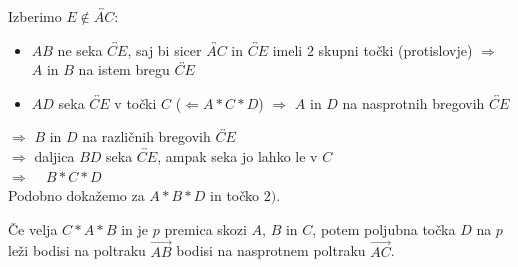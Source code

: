 \begin{dokaz}
                    
                \noindent Izberimo $E\notin \overleftrightarrow{AC}$:
                \begin{itemize}
                    \item $AB$ ne seka $\overleftrightarrow{CE}$, saj bi sicer $\overleftrightarrow{AC}$ in $\overleftrightarrow{CE}$ imeli $2$ skupni točki (protislovje) $\Rightarrow$ $A$ in $B$ na istem bregu $\overleftrightarrow{CE}$
                    \item $AD$ seka $\overleftrightarrow{CE}$ v točki $C$ ($\Leftarrow A\ast C\ast D$) $\Rightarrow$ $A$ in $D$ na nasprotnih bregovih $\overleftrightarrow{CE}$
                \end{itemize}
                $\Rightarrow$ $B$ in $D$ na različnih bregovih $\overleftrightarrow{CE}$ \\
                $\Rightarrow$ daljica $BD$ seka $\overleftrightarrow{CE}$, ampak seka jo lahko le v $C$ \\
                $\Rightarrow$ ~ $B\ast C\ast D$ \\
                Podobno dokažemo za $A\ast B\ast D$ in točko $2)$.
        \end{dokaz}

    \begin{posledica}
        Če velja $C\ast A\ast B$ in je $p$ premica skozi $A$, $B$ in $C$, potem poljubna točka $D$ na $p$ leži bodisi na poltraku $\overrightarrow{AB}$ bodisi na nasprotnem poltraku $\overrightarrow{AC}$.
    \end{posledica}

